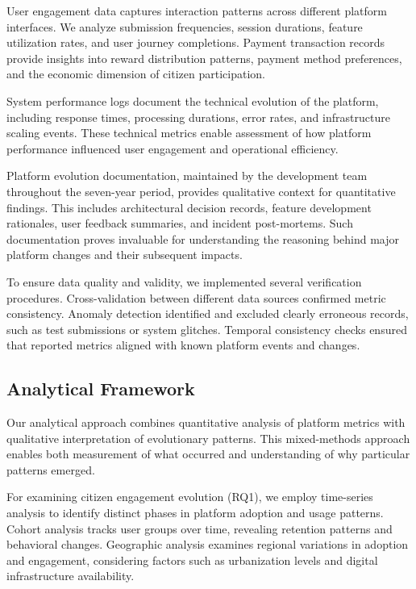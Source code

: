 \documentclass[pdflatex,sn-mathphys-num]{sn-jnl}%
\theoremstyle{thmstyleone}%
\theoremstyle{thmstyletwo}%
\theoremstyle{thmstylethree}%
\begin{document}
User engagement data captures interaction patterns across different platform interfaces. We analyze submission frequencies, session durations, feature utilization rates, and user journey completions. Payment transaction records provide insights into reward distribution patterns, payment method preferences, and the economic dimension of citizen participation.

System performance logs document the technical evolution of the platform, including response times, processing durations, error rates, and infrastructure scaling events. These technical metrics enable assessment of how platform performance influenced user engagement and operational efficiency.

Platform evolution documentation, maintained by the development team throughout the seven-year period, provides qualitative context for quantitative findings. This includes architectural decision records, feature development rationales, user feedback summaries, and incident post-mortems. Such documentation proves invaluable for understanding the reasoning behind major platform changes and their subsequent impacts.

To ensure data quality and validity, we implemented several verification procedures. Cross-validation between different data sources confirmed metric consistency. Anomaly detection identified and excluded clearly erroneous records, such as test submissions or system glitches. Temporal consistency checks ensured that reported metrics aligned with known platform events and changes.

\subsection{Analytical Framework}\label{subsec11}

Our analytical approach combines quantitative analysis of platform metrics with qualitative interpretation of evolutionary patterns. This mixed-methods approach enables both measurement of what occurred and understanding of why particular patterns emerged.

For examining citizen engagement evolution (RQ1), we employ time-series analysis to identify distinct phases in platform adoption and usage patterns. Cohort analysis tracks user groups over time, revealing retention patterns and behavioral changes. Geographic analysis examines regional variations in adoption and engagement, considering factors such as urbanization levels and digital infrastructure availability.
\end{document}
